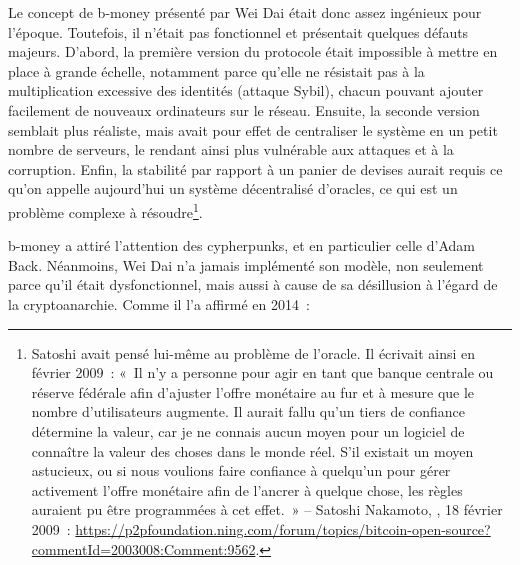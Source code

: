 Le concept de b-money présenté par Wei Dai était donc assez ingénieux pour l'époque. Toutefois, il n'était pas fonctionnel et présentait quelques défauts majeurs. D'abord, la première version du protocole était impossible à mettre en place à grande échelle, notamment parce qu'elle ne résistait pas à la multiplication excessive des identités (attaque Sybil), chacun pouvant ajouter facilement de nouveaux ordinateurs sur le réseau. Ensuite, la seconde version semblait plus réaliste, mais avait pour effet de centraliser le système en un petit nombre de serveurs, le rendant ainsi plus vulnérable aux attaques et à la corruption. Enfin, la stabilité par rapport à un panier de devises aurait requis ce qu'on appelle aujourd'hui un système décentralisé d'oracles, ce qui est un problème complexe à résoudre\footnote{Satoshi avait pensé lui-même au problème de l'oracle. Il écrivait ainsi en février 2009~: «~Il n'y a personne pour agir en tant que banque centrale ou réserve fédérale afin d'ajuster l'offre monétaire au fur et à mesure que le nombre d'utilisateurs augmente. Il aurait fallu qu'un tiers de confiance détermine la valeur, car je ne connais aucun moyen pour un logiciel de connaître la valeur des choses dans le monde réel. S'il existait un moyen astucieux, ou si nous voulions faire confiance à quelqu'un pour gérer activement l'offre monétaire afin de l'ancrer à quelque chose, les règles auraient pu être programmées à cet effet.~» -- Satoshi Nakamoto, , 18 février 2009~: \url{https://p2pfoundation.ning.com/forum/topics/bitcoin-open-source?commentId=2003008:Comment:9562}.}. %

b-money a attiré l'attention des cypherpunks, et en particulier celle d'Adam Back. Néanmoins, Wei Dai n'a jamais implémenté son modèle, non seulement parce qu'il était dysfonctionnel, mais aussi à cause de sa désillusion à l'égard de la cryptoanarchie. Comme il l'a affirmé en 2014~:

